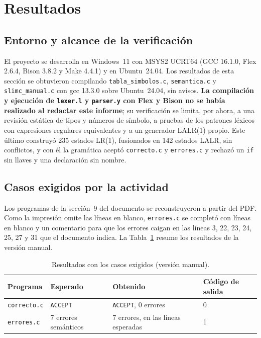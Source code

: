 \documentclass[runningheads]{llncs}
\begin{document}
\section{Resultados}
\subsection{Entorno y alcance de la verificación}
El proyecto se desarrolla en Windows~11 con MSYS2 UCRT64 (GCC 16.1.0, Flex 2.6.4, Bison 3.8.2 y Make 4.4.1) y en Ubuntu~24.04. Los resultados de esta sección se obtuvieron compilando \texttt{tabla\_simbolos.c}, \texttt{semantica.c} y \texttt{slimc\_manual.c} con gcc 13.3.0 sobre Ubuntu~24.04, sin avisos. \textbf{La compilación y ejecución de \texttt{lexer.l} y \texttt{parser.y} con Flex y Bison no se había realizado al redactar este informe}; su verificación se limita, por ahora, a una revisión estática de tipos y números de símbolo, a pruebas de los patrones léxicos con expresiones regulares equivalentes y a un generador LALR(1) propio. Este último construyó 235 estados LR(1), fusionados en 142 estados LALR, sin conflictos, y con él la gramática aceptó \texttt{correcto.c} y \texttt{errores.c} y rechazó un \texttt{if} sin llaves y una declaración sin nombre.

\subsection{Casos exigidos por la actividad}
Los programas de la sección~9 del documento se reconstruyeron a partir del PDF. Como la impresión omite las líneas en blanco, \texttt{errores.c} se completó con líneas en blanco y un comentario para que los errores caigan en las líneas 3, 22, 23, 24, 25, 27 y 31 que el documento indica. La Tabla~\ref{tab:casos} resume los resultados de la versión manual.

\begin{table}[t]
\caption{Resultados con los casos exigidos (versión manual).}\label{tab:casos}
\centering\footnotesize
\begin{tabular}{@{}llll@{}}
\toprule
Programa & Esperado & Obtenido & Código de salida\\
\midrule
\texttt{correcto.c} & \texttt{ACCEPT} & \texttt{ACCEPT}, 0 errores & 0\\
\texttt{errores.c} & 7 errores semánticos & 7 errores, en las líneas esperadas & 1\\
\bottomrule
\end{tabular}
\end{table}
\end{document}

